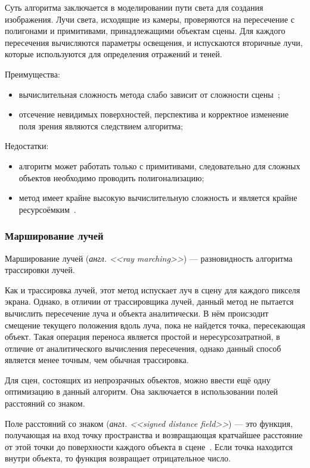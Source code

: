Суть алгоритма заключается в моделировании пути света для создания изображения.
Лучи света, исходящие из камеры, проверяются на пересечение с полигонами и примитивами, принадлежащими объектам сцены.
Для каждого пересечения вычисляются параметры освещения, и испускаются вторичные лучи, которые используются для определения отражений и теней.

Преимущества:
\begin{itemize}
  \item вычислительная сложность метода слабо зависит от сложности сцены~\cite{rt_rendering};
  \item отсечение невидимых поверхностей, перспектива и корректное изменение поля зрения являются следствием алгоритма;
\end{itemize}

Недостатки:
\begin{itemize}
  \item алгоритм может работать только с примитивами, следовательно для сложных объектов необходимо проводить полигонализацию;
  \item метод имеет крайне высокую вычислительную сложность и является крайне ресурсоёмким~\cite{rt_rendering}.
\end{itemize}

\subsubsection{Марширование лучей}
Марширование лучей (\textit{англ. <<ray marching>>}) --- разновидность алгоритма трассировки лучей.

Как и трассировка лучей, этот метод испускает луч в сцену для каждого пикселя экрана.
Однако, в отличии от трассировщика лучей, данный метод не пытается вычислить пересечение луча и объекта аналитически.
В нём происзодит смещение текущего положения вдоль луча, пока не найдется точка, пересекающая объект.
Такая операция переноса является простой и нересурсозатратной, в отличие от аналитического вычисления пересечения,
однако данный способ является менее точным, чем обычная трассировка.

Для сцен, состоящих из непрозрачных объектов, можно ввести ещё одну оптимизацию в данный алгоритм.
Она заключается в использовании полей расстояний со знаком.

Поле расстояний со знаком (\textit{англ. <<signed distance field>>}) --- это функция,
получающая на вход точку пространства и возвращающая кратчайшее расстояние от этой точки
до поверхности каждого объекта в сцене~\cite{sdf}. Если точка находится внутри объекта, то функция возвращает отрицательное число.

